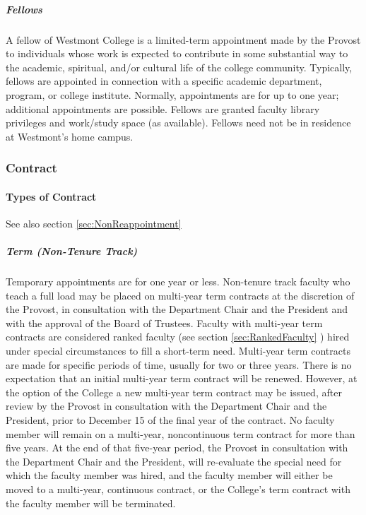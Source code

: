 				\subparagraph{Fellows}
					A fellow of Westmont College is a limited-term appointment made by the Provost to individuals whose work is expected to contribute in some substantial way to the academic, spiritual, and/or cultural life of the college community.  Typically, fellows are appointed in connection with a specific academic department, program, or college institute.  Normally, appointments are for up to one year; additional appointments are possible.  Fellows are granted faculty library privileges and work/study space (as available).  Fellows need not be in residence at Westmont's home campus.
		\subsubsection{Contract}
			\paragraph{Types of Contract}
				See also
				section
				\ref{sec:NonReappointment}
				\subparagraph{Term (Non-Tenure Track)}
					\label{sec:Contract-Temporary}
					Temporary appointments are for one year or less.
					Non-tenure track faculty who teach a full load may be placed on multi-year term contracts at the discretion of the Provost, in consultation with the Department Chair and the President and with the approval of the Board of Trustees.  Faculty with multi-year term contracts are considered ranked faculty (see
					section
					\ref{sec:RankedFaculty}
					) hired under special circumstances to fill a short-term need.  Multi-year term contracts are made for specific periods of time, usually for two or three years.  There is no expectation that an initial multi-year term contract will be renewed.  However, at the option of the College a new multi-year term contract may be issued, after review by the Provost in consultation with the Department Chair and the President, prior to December 15 of the final year of the contract.  No faculty member will remain on a multi-year, noncontinuous term contract for more than five years.  At the end of that five-year period, the Provost in consultation with the Department Chair and the President, will re-evaluate the special need for which the faculty member was hired, and the faculty member will either be moved to a multi-year, continuous contract, or the College's term contract with the faculty member will be terminated.
